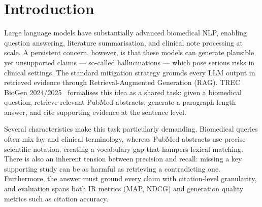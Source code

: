 
\section{Introduction}
\label{sec:intro}

Large language models have substantially advanced biomedical NLP, enabling
question answering, literature summarisation, and clinical note processing at
scale.  A persistent concern, however, is that these models can generate
plausible yet unsupported claims — so-called hallucinations — which pose
serious risks in clinical settings.  The standard mitigation strategy grounds
every LLM output in retrieved evidence through Retrieval-Augmented Generation
(RAG).  TREC BioGen 2024/2025~\cite{biogen2024} formalises this idea as a
shared task: given a biomedical question, retrieve relevant PubMed abstracts,
generate a paragraph-length answer, and cite supporting evidence at the
sentence level.

Several characteristics make this task particularly demanding.
Biomedical queries often mix lay and clinical terminology, whereas PubMed
abstracts use precise scientific notation, creating a vocabulary gap that
hampers lexical matching.  There is also an inherent tension between precision
and recall: missing a key supporting study can be as harmful as retrieving a
contradicting one.  Furthermore, the answer must ground every claim with
citation-level granularity, and evaluation spans both IR metrics (MAP, NDCG)
and generation quality metrics such as citation accuracy.

